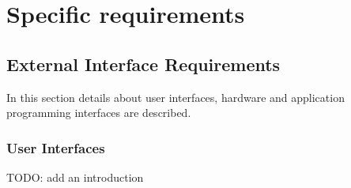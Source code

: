 \section{Specific requirements}

\subsection{External Interface Requirements}
In this section details about user interfaces, hardware and application programming interfaces are described.

\subsubsection{User Interfaces}
TODO: add an introduction
\begin{figure}[H]
    \centering
\end{figure}
